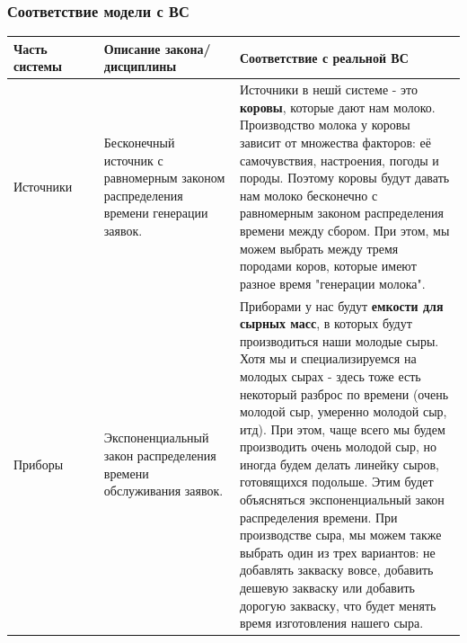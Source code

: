 \documentclass[a4paper, 14pt]{article}
\begin{document}
\subsubsection{Соответствие модели с ВС}

\begin{center}
	\begin{tabular}{|p{0.2\linewidth} | p{0.3\linewidth}| p{0.5\linewidth}|}
		\hline
		Часть системы      & Описание закона/дисциплины                                                           & Соответствие с реальной ВС                                                                                                                                                                                                                                                                                                                                                                                                                                                                                                                                                                                                                                     \\
		\hline
		Источники          & Бесконечный источник с равномерным законом распределения времени генерации заявок.   & Источники в нешй системе - это \textbf{коровы}, которые дают нам молоко. Производство молока у коровы зависит от множества факторов: её самочувствия, настроения, погоды и породы. Поэтому коровы будут давать нам молоко бесконечно с равномерным законом распределения времени между сбором. При этом, мы можем выбрать между тремя породами коров, которые имеют разное время "генерации молока".                                                                                                                                                                                                                                                           \\
		\hline
		Приборы            & Экспоненциальный закон распределения времени обслуживания заявок.                    & Приборами у нас будут \textbf{емкости для сырных масс}, в которых будут производиться наши молодые сыры. Хотя мы и специализируемся на молодых сырах - здесь тоже есть некоторый разброс по времени (очень молодой сыр, умеренно молодой сыр, итд). При этом, чаще всего мы будем производить очень молодой сыр, но иногда будем делать линейку сыров, готовящихся подольше. Этим будет объясняться экспоненциальный закон распределения времени. При производстве сыра, мы можем также выбрать один из трех вариантов: не добавлять закваску вовсе, добавить дешевую закваску или добавить дорогую закваску, что будет менять время изготовления нашего сыра. \\

\end{tabular}
\end{center}
\end{document}
